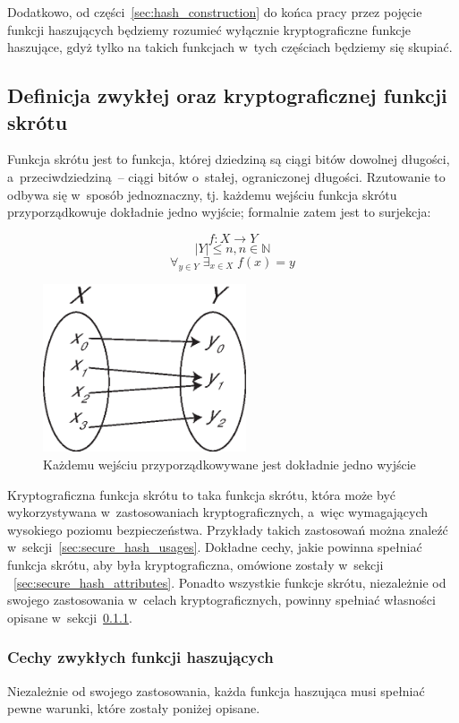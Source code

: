 \documentclass[12pt,a4paper,twoside]{article}
\begin{document}
Dodatkowo, od części~\ref{sec:hash_construction} do końca pracy przez pojęcie
funkcji haszujących będziemy rozumieć wyłącznie kryptograficzne funkcje
haszujące, gdyż tylko na takich funkcjach w~tych częściach będziemy się
skupiać.
\pagebreak



\subsection{Definicja zwykłej oraz kryptograficznej funkcji skrótu}
Funkcja skrótu jest to funkcja, której dziedziną są ciągi bitów dowolnej
długości, a~przeciwdziedziną~-- ciągi bitów o~stałej, ograniczonej długości.
Rzutowanie to odbywa się w~sposób jednoznaczny, tj. każdemu wejściu funkcja
skrótu przyporządkowuje dokładnie jedno wyjście; formalnie zatem jest to
surjekcja:

$$ f \colon X \to Y $$
$$ |Y| \leq n, n \in \mathbb{N} $$
$$ \forall_{y \in Y} \; \exists_{x \in X} \; f(x)=y $$

\begin{figure}[htb!]
    \includegraphics[width=6cm]{img/surjection.eps}
    \caption{Każdemu wejściu przyporządkowywane jest dokładnie jedno wyjście}
    \label{fig:surjection}
\end{figure}

Kryptograficzna funkcja skrótu to taka funkcja skrótu, która może być
wykorzystywana w~zastosowaniach kryptograficznych, a~więc wymagających
wysokiego poziomu bezpieczeństwa. Przykłady takich zastosowań można znaleźć
w~sekcji~\ref{sec:secure_hash_usages}. Dokładne cechy, jakie powinna spełniać
funkcja skrótu, aby była kryptograficzna, omówione zostały w~sekcji
~\ref{sec:secure_hash_attributes}. Ponadto wszystkie funkcje skrótu,
niezależnie od swojego zastosowania w~celach kryptograficznych, powinny
spełniać własności opisane w~sekcji~\ref{sec:common_hash_attributes}.



\subsubsection{Cechy zwykłych funkcji haszujących}
\label{sec:common_hash_attributes}
Niezależnie od swojego zastosowania, każda funkcja haszująca musi spełniać
pewne warunki, które zostały poniżej opisane.
\end{document}
